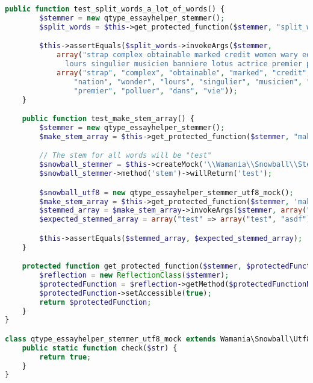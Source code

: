 \begin{lstlisting}[language=php,frame=l,style=default]
    public function test_split_words_a_lot_of_words() {
        $stemmer = new qtype_essayhelper_stemmer();
        $split_words = $this->get_protected_function($stemmer, "split_words");

        $this->assertEquals($split_words->invokeArgs($stemmer,
            array("strap complex obtainable marked credit women wary educate nation wonder
              lours singulier musicien banniere lotus actrice premier polluer dans vie")),
            array("strap", "complex", "obtainable", "marked", "credit", "women", "wary", "educate",
                "nation", "wonder", "lours", "singulier", "musicien", "banni\`ere", "lotus", "actrice",
                "premier", "polluer", "dans", "vie"));
    }

    public function test_make_stem_array() {
        $stemmer = new qtype_essayhelper_stemmer();
        $make_stem_array = $this->get_protected_function($stemmer, "make_stem_array");

        // The stem for all words will be "test"
        $snowball_stemmer = $this->createMock('\\Wamania\\Snowball\\Stemmer', array('stem'));
        $snowball_stemmer->method('stem')->willReturn('test');

        $snowball_utf8 = new qtype_essayhelper_stemmer_utf8_mock();
        $make_stem_array = $this->get_protected_function($stemmer, 'make_stem_array');
        $stemmed_array = $make_stem_array->invokeArgs($stemmer, array("test asdf", $snowball_stemmer, $snowball_utf8));
        $expected_stemmed_array = array("test" => array("test", "asdf"));

        $this->assertEquals($stemmed_array, $expected_stemmed_array);
    }

    protected function get_protected_function($stemmer, $protectedFunctionName) {
        $reflection = new ReflectionClass($stemmer);
        $protectedFunction = $reflection->getMethod($protectedFunctionName);
        $protectedFunction->setAccessible(true);
        return $protectedFunction;
    }
}

class qtype_essayhelper_stemmer_utf8_mock extends Wamania\Snowball\Utf8 {
    public static function check($str) {
        return true;
    }
}
\end{lstlisting}
